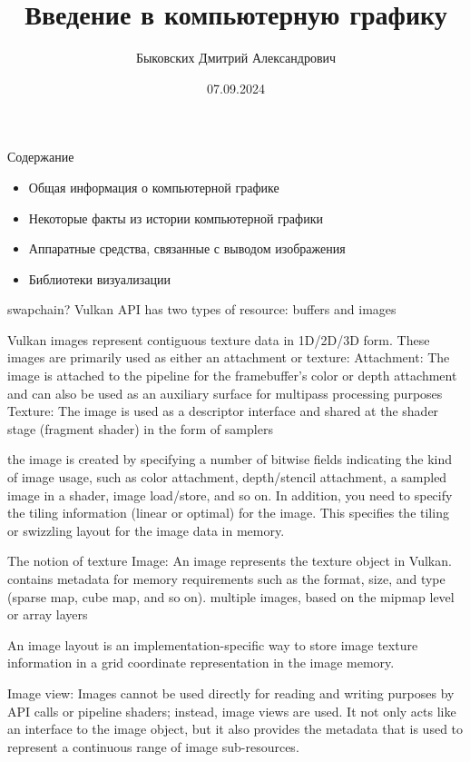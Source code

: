 \documentclass{beamer}
\title[Введение в КГ]{Введение в компьютерную графику}
\author[Быковских Д.А.]{Быковских Дмитрий Александрович}
\date{07.09.2024}
\begin{document}
	\begin{frame}
		\titlepage
	\end{frame}
	\begin{frame}{Содержание}
		\begin{itemize}
			\item 
			Общая информация о компьютерной графике
			\item
			Некоторые факты из истории компьютерной графики
			\item
			Аппаратные средства, связанные с выводом изображения
			\item 
			Библиотеки визуализации
		\end{itemize}
	\end{frame}
	
	\begin{frame}
		swapchain?
		Vulkan API has two types of resource: buffers and images

		Vulkan images represent contiguous texture data in 1D/2D/3D form. These images are primarily used as either an attachment or texture:
			Attachment: The image is attached to the pipeline for the framebuffer's color or depth attachment and can also be used as an auxiliary surface for multipass 	processing purposes
			Texture: The image is used as a descriptor interface and shared at the shader stage (fragment shader) in the form of samplers

			the image is created by specifying a number of bitwise fields indicating the kind of image usage, such as color attachment, depth/stencil attachment, a sampled image in a shader, image load/store, and so on. 
			In addition, you need to specify the tiling information (linear or optimal) for the image. This specifies the tiling or swizzling layout for the image data in memory.

			The notion of texture
			Image: An image represents the texture object in Vulkan.
			contains metadata for memory requirements such as the format, size, and type (sparse
			map, cube map, and so on). multiple images, based on the mipmap level or array layers

			An image layout is an implementation-specific way to store image texture information in a grid coordinate representation in the image memory.

			Image view: Images cannot be used directly for reading and writing purposes by API calls or pipeline shaders; instead, image views are used. It not only acts like an interface to the image object, but it also provides the metadata that is used to represent a continuous range of image sub-resources.

	\end{frame}
\end{document}
